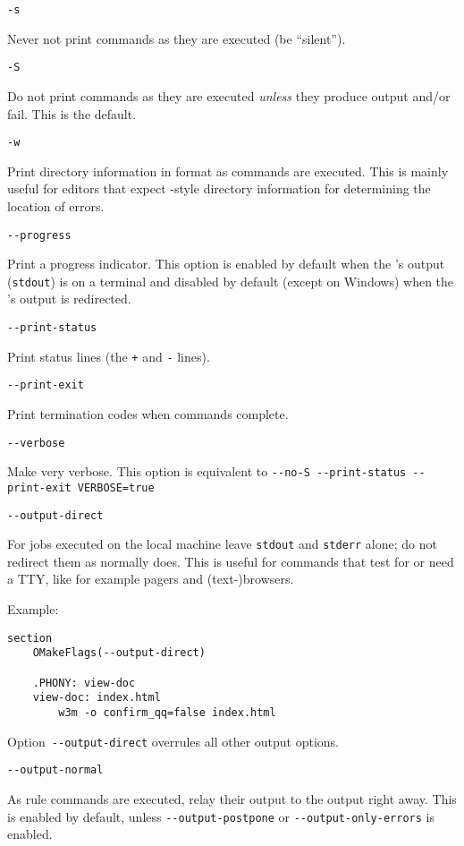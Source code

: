  \verb+-s+

Never not print commands as they are executed (be ``silent'').


 \verb+-S+

Do not print commands as they are executed \emph{unless} they produce output and/or
fail. This is the default.

 \verb+-w+

Print directory information in  format as commands are executed.
This is mainly useful for editors that expect -style
directory information for determining the location of errors.

 \verb+--progress+

Print a progress indicator. This option is enabled by default when the \OMake's output
(\verb+stdout+) is on a terminal and disabled by default (except on Windows) when the \OMake's
output is redirected.

 \verb+--print-status+

Print status lines (the \verb/+/ and \verb/-/ lines).

 \verb+--print-exit+

Print termination codes when commands complete.

 \verb+--verbose+

Make \OMake{} very verbose. This option is equivalent to
\verb+--no-S --print-status --print-exit VERBOSE=true+

 \verb+--output-direct+

For jobs executed on the local machine leave \verb+stdout+ and \verb+stderr+ alone; do not redirect
them as \OMake{} normally does.  This is useful for commands that test for or need a TTY, like for
example pagers and (text-)browsers.

Example:
\begin{verbatim}
section
    OMakeFlags(--output-direct)

    .PHONY: view-doc
    view-doc: index.html
        w3m -o confirm_qq=false index.html
\end{verbatim}

Option~\verb+--output-direct+ overrules all other output options.

 \verb+--output-normal+

As rule commands are executed, relay their output to the \OMake{} output right away. This is enabled
by default, unless \verb+--output-postpone+ or \verb+--output-only-errors+ is enabled.

